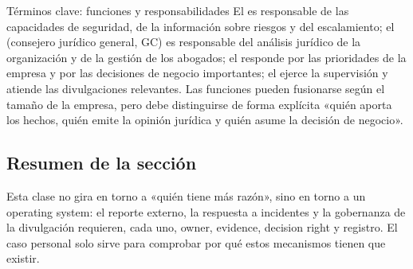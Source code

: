 \begin{knowledgebox}{Términos clave: funciones y responsabilidades}
El  es responsable de las capacidades de seguridad, de la información sobre riesgos y del escalamiento; el  (consejero jurídico general, GC) es responsable del análisis jurídico de la organización y de la gestión de los abogados; el  responde por las prioridades de la empresa y por las decisiones de negocio importantes; el  ejerce la supervisión y atiende las divulgaciones relevantes. Las funciones pueden fusionarse según el tamaño de la empresa, pero debe distinguirse de forma explícita «quién aporta los hechos, quién emite la opinión jurídica y quién asume la decisión de negocio».
\end{knowledgebox}

\subsection{Resumen de la sección}

Esta clase no gira en torno a «quién tiene más razón», sino en torno a un operating system: el reporte externo, la respuesta a incidentes y la gobernanza de la divulgación requieren, cada uno, owner, evidence, decision right y registro. El caso personal solo sirve para comprobar por qué estos mecanismos tienen que existir.
